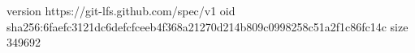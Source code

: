 version https://git-lfs.github.com/spec/v1
oid sha256:6faefc3121dc6defcfceeb4f368a21270d214b809c0998258c51a2f1c86fc14c
size 349692
